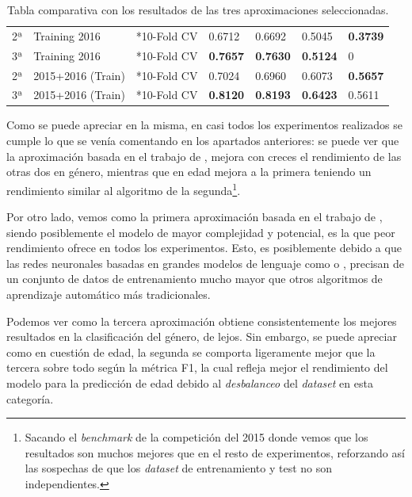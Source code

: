 \begin{table}[H]
{\begin{tabular}{|l|l|l|ll|ll|}
            2ª & Training 2016 & *10-Fold CV & 0.6712 & 0.6692 & 0.5045  & \textbf{0.3739}\\
            3ª & Training 2016 & *10-Fold CV & \textbf{0.7657} & \textbf{0.7630} & \textbf{0.5124} & 0 \\
            \hline
            
            2ª & 2015+2016 (Train) & *10-Fold CV & 0.7024 & 0.6960 & 0.6073  & \textbf{0.5657} \\
            3ª & 2015+2016 (Train) & *10-Fold CV & \textbf{0.8120} & \textbf{0.8193} & \textbf{0.6423} & 0.5611 \\ \hline
            
        \end{tabular}
    }
    \caption{Tabla comparativa con los resultados de las tres aproximaciones seleccionadas.}
\label{tab:fundamentos-comparativa}
\end{table}

Como se puede apreciar en la misma, en casi todos los experimentos realizados se cumple lo que se venía comentando en los apartados anteriores: se puede ver que la aproximación basada en el trabajo de \citet{modaresi:2016}, mejora con creces el rendimiento de las otras dos en género, mientras que en edad mejora a la primera teniendo un rendimiento similar al algoritmo de la segunda\footnote{Sacando el \textit{benchmark} de la competición del 2015 donde vemos que los resultados son muchos mejores que en el resto de experimentos, reforzando así las sospechas de que los \textit{dataset} de entrenamiento y test no son independientes.}. 

Por otro lado, vemos como la primera aproximación basada en el trabajo de \citet{loscalis22}, siendo posiblemente el modelo de  mayor complejidad y potencial, es la que peor rendimiento ofrece en todos los experimentos. Esto, es posiblemente debido a que las redes neuronales basadas en grandes modelos de lenguaje como \citet{devlin2019bert} o \citet{MarIA}, precisan de un conjunto de datos de entrenamiento mucho mayor que otros algoritmos de aprendizaje automático más tradicionales.

Podemos ver como la tercera aproximación obtiene consistentemente los mejores resultados en la clasificación del género, de lejos. Sin embargo, se puede apreciar como en cuestión de edad, la segunda se comporta ligeramente mejor que la tercera sobre todo según la métrica F1, la cual refleja mejor el rendimiento del modelo para la predicción de edad debido al \textit{desbalanceo} del \textit{dataset} en esta categoría.

